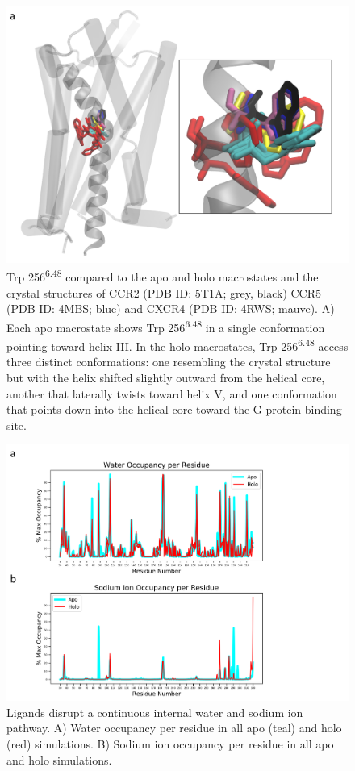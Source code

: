 \begin{figure}[htbp]
\centering
\includegraphics[width=\textwidth]{./figures/trp256.png}
\caption[Analysis of CCR2  conformations]{Trp 256\textsuperscript{6.48} compared to the apo and holo macrostates and the crystal structures of CCR2 (PDB ID: 5T1A; grey, black) CCR5 (PDB ID: 4MBS; blue) and CXCR4 (PDB ID: 4RWS; mauve). A) Each apo macrostate shows Trp 256\textsuperscript{6.48} in a single conformation pointing toward helix III. In the holo macrostates, Trp 256\textsuperscript{6.48} access three distinct conformations: one resembling the crystal structure but with the helix shifted slightly outward from the helical core, another that laterally twists toward helix V, and one conformation that points down into the helical core toward the G-protein binding site.}
\label{fig:trp256}
\end{figure}

\begin{figure}[htbp]
\centering
\includegraphics[width=\textwidth]{./figures/water_na_plots.png}
\caption[Ligand disruption of internal water and sodium ion pathways in CCR2]{Ligands disrupt a continuous internal water and sodium ion pathway. A) Water occupancy per residue in all apo (teal) and holo (red) simulations. B) Sodium ion occupancy per residue in all apo and holo simulations.}
\label{fig:water_na_plots}
\end{figure}

